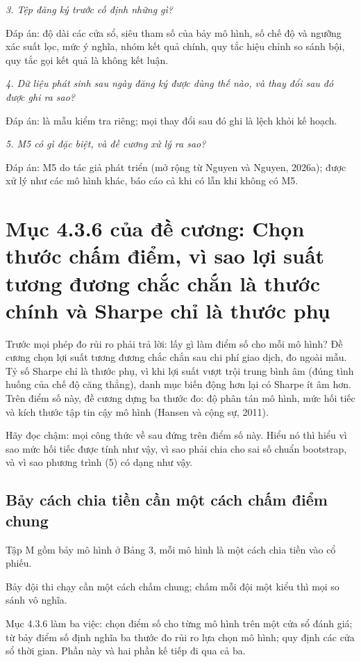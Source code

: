 {\itshape 3. Tệp đăng ký trước cố định những gì?\par}

Đáp án: độ dài các cửa sổ, siêu tham số của bảy mô hình, số chế độ và ngưỡng xác suất lọc, mức ý nghĩa, nhóm kết quả chính, quy tắc hiệu chỉnh so sánh bội, quy tắc gọi kết quả là không kết luận.

{\itshape 4. Dữ liệu phát sinh sau ngày đăng ký được dùng thế nào, và thay đổi sau đó được ghi ra sao?\par}

Đáp án: là mẫu kiểm tra riêng; mọi thay đổi sau đó ghi là lệch khỏi kế hoạch.

{\itshape 5. M5 có gì đặc biệt, và đề cương xử lý ra sao?\par}

Đáp án: M5 do tác giả phát triển (mở rộng từ Nguyen và Nguyen, 2026a); được xử lý như các mô hình khác, báo cáo cả khi có lẫn khi không có M5.

\chapter{Mục 4.3.6 của đề cương: Chọn thước chấm điểm, vì sao lợi suất tương đương chắc chắn là thước chính và Sharpe chỉ là thước phụ}

Trước mọi phép đo rủi ro phải trả lời: lấy gì làm điểm số cho mỗi mô hình? Đề cương chọn lợi suất tương đương chắc chắn sau chi phí giao dịch, đo ngoài mẫu. Tỷ số Sharpe chỉ là thước phụ, vì khi lợi suất vượt trội trung bình âm (đúng tình huống của chế độ căng thẳng), danh mục biến động hơn lại có Sharpe ít âm hơn. Trên điểm số này, đề cương dựng ba thước đo: độ phân tán mô hình, mức hối tiếc và kích thước tập tin cậy mô hình (Hansen và cộng sự, 2011).

Hãy đọc chậm: mọi công thức về sau đứng trên điểm số này. Hiểu nó thì hiểu vì sao mức hối tiếc được tính như vậy, vì sao phải chia cho sai số chuẩn bootstrap, và vì sao phương trình (5) có dạng như vậy.

\section{Bảy cách chia tiền cần một cách chấm điểm chung}

Tập M gồm bảy mô hình ở Bảng 3, mỗi mô hình là một cách chia tiền vào cổ phiếu.

Bảy đội thi chạy cần một cách chấm chung; chấm mỗi đội một kiểu thì mọi so sánh vô nghĩa.

Mục 4.3.6 làm ba việc: chọn điểm số cho từng mô hình trên một cửa sổ đánh giá; từ bảy điểm số định nghĩa ba thước đo rủi ro lựa chọn mô hình; quy định các cửa sổ thời gian. Phần này và hai phần kế tiếp đi qua cả ba.

